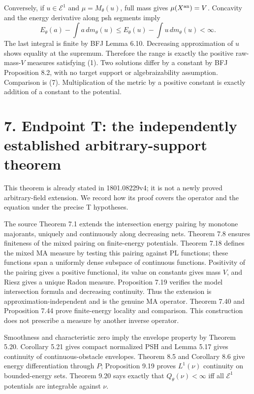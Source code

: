 \documentclass[11pt]{article}
\begin{document}
Conversely, if \(u\in\mathcal E^1\) and \(\mu=M_\theta(u)\), full mass gives \(\mu(X^{\rm an})=V\). Concavity and the energy derivative along psh segments imply
\[
 E_\theta(a)-\int a\,dm_\theta(u)
 \leq E_\theta(u)-\int u\,dm_\theta(u)<\infty.
\]
The last integral is finite by BFJ Lemma 6.10. Decreasing approximation of \(u\) shows equality at the supremum. Therefore the range is exactly the positive raw-mass-\(V\) measures satisfying (1). Two solutions differ by a constant by BFJ Proposition 8.2, with no target support or algebraizability assumption. Comparison is (7). Multiplication of the metric by a positive constant is exactly addition of a constant to the potential.

\section*{7. Endpoint T: the independently established arbitrary-support theorem}

This theorem is already stated in 1801.08229v4; it is not a newly proved arbitrary-field extension. We record how its proof covers the operator and the equation under the precise T hypotheses.

The source Theorem 7.1 extends the intersection energy pairing by monotone majorants, uniquely and continuously along decreasing nets. Theorem 7.8 ensures finiteness of the mixed pairing on finite-energy potentials. Theorem 7.18 defines the mixed MA measure by testing this pairing against PL functions; these functions span a uniformly dense subspace of continuous functions. Positivity of the pairing gives a positive functional, its value on constants gives mass \(V\), and Riesz gives a unique Radon measure. Proposition 7.19 verifies the model intersection formula and decreasing continuity. Thus the extension is approximation-independent and is the genuine MA operator. Theorem 7.40 and Proposition 7.44 prove finite-energy locality and comparison. This construction does not prescribe a measure by another inverse operator.

Smoothness and characteristic zero imply the envelope property by Theorem 5.20. Corollary 5.21 gives compact normalized PSH and Lemma 5.17 gives continuity of continuous-obstacle envelopes. Theorem 8.5 and Corollary 8.6 give energy differentiation through \(P\); Proposition 9.19 proves \(L^1(\nu)\) continuity on bounded-energy sets. Theorem 9.20 says exactly that \(Q_\theta(\nu)<\infty\) iff all \(\mathcal E^1\) potentials are integrable against \(\nu\).
\end{document}
